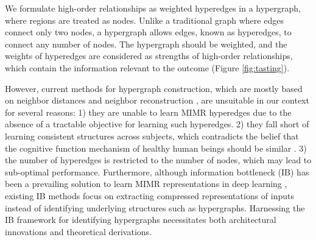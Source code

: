 
We formulate high-order relationships as weighted hyperedges in a hypergraph, where regions are treated as nodes. Unlike a traditional graph where edges connect only two nodes, a hypergraph allows edges, known as hyperedges, to connect any number of nodes. The hypergraph should be weighted, and the weights of hyperedges are considered as strengths of high-order relationships, which contain the information relevant to the outcome (Figure \ref{fig:tasting}). 


However, current methods for hypergraph construction, which are mostly based on neighbor distances and neighbor reconstruction \citep{wang2015visual,liu2017elastic,jin2019robust,huang2009video}, are unsuitable in our context for several reasons: 1) they are unable to learn MIMR hyperedges due to the absence of a tractable objective for learning such hyperedges.  2) they fall short of learning consistent structures across subjects, which contradicts the belief that the cognitive function mechanism of healthy human beings should be similar \citep{wang2023inference}. 3) the number of hyperedges is restricted to the number of nodes, which may lead to sub-optimal performance. Furthermore, although information bottleneck (IB) has been a prevailing solution to learn MIMR representations in deep learning \citep{kim2021drop,alemi2016deep,luo2019significance}, existing IB methods focus on extracting compressed representations of inputs instead of identifying underlying structures such as hypergraphs. Harnessing the IB framework for identifying hypergraphs necessitates both architectural innovations and theoretical derivations.

